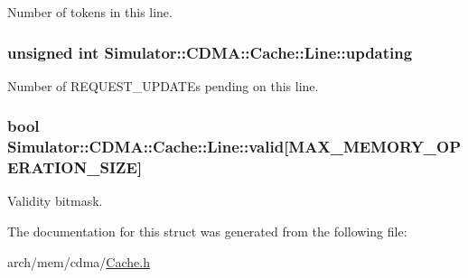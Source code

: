 Number of tokens in this line. 

\hypertarget{struct_simulator_1_1_c_d_m_a_1_1_cache_1_1_line_a69897df58e274ca6b725235039354f09}{
\subsubsection[{updating}]{\setlength{\rightskip}{0pt plus 5cm}unsigned int Simulator\+::\+C\+D\+M\+A\+::\+Cache\+::\+Line\+::updating}}\label{struct_simulator_1_1_c_d_m_a_1_1_cache_1_1_line_a69897df58e274ca6b725235039354f09}


Number of R\+E\+Q\+U\+E\+S\+T\+\_\+\+U\+P\+D\+A\+T\+Es pending on this line. 

\hypertarget{struct_simulator_1_1_c_d_m_a_1_1_cache_1_1_line_a2d54eb0d7314994bf848a36f462b0bf4}{
\subsubsection[{valid}]{\setlength{\rightskip}{0pt plus 5cm}bool Simulator\+::\+C\+D\+M\+A\+::\+Cache\+::\+Line\+::valid\mbox{[}M\+A\+X\+\_\+\+M\+E\+M\+O\+R\+Y\+\_\+\+O\+P\+E\+R\+A\+T\+I\+O\+N\+\_\+\+S\+I\+Z\+E\mbox{]}}}\label{struct_simulator_1_1_c_d_m_a_1_1_cache_1_1_line_a2d54eb0d7314994bf848a36f462b0bf4}


Validity bitmask. 



The documentation for this struct was generated from the following file\+:\begin{DoxyCompactItemize}
\item 
arch/mem/cdma/\hyperlink{cdma_2_cache_8h}{Cache.\+h}\end{DoxyCompactItemize}
